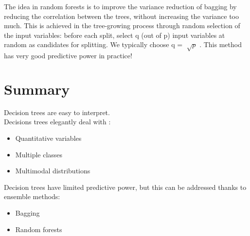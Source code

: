 \documentclass[a4paper,12pt]{article}
\begin{document}
The idea in random forests is to improve the variance reduction of bagging by reducing the correlation between the trees, without increasing the variance too much. This is achieved in the tree-growing process through random selection of the input variables: before each split, select q (out of p) input variables at random as candidates for splitting. We typically choose q = $\sqrt[]{p}$ .
This method has very good predictive power in practice!

\section{Summary}

Decision trees are easy to interpret.\\
Decisions trees elegantly deal with :
\begin{itemize}
\item Quantitative variables
\item Multiple classes
\item Multimodal distributions
\end{itemize}
Decision trees have limited predictive power, but this can be addressed thanks to ensemble methods:
\begin{itemize}
\item Bagging 
\item Random forests 
 \end{itemize}
\end{document}
